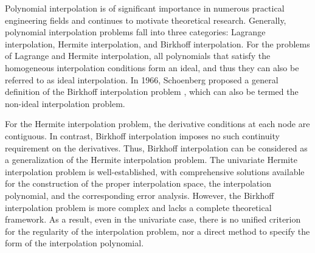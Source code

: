 \documentclass[preprint,12pt]{elsarticle}
\begin{document}



Polynomial interpolation is of significant importance in numerous practical engineering fields and continues to motivate theoretical research. Generally, polynomial interpolation problems fall into three categories: Lagrange interpolation, Hermite interpolation, and Birkhoff interpolation. For the problems of Lagrange and Hermite interpolation, all polynomials that satisfy the homogeneous interpolation conditions form an ideal, and thus they can also be referred to as ideal interpolation. In 1966, Schoenberg proposed a general definition of the Birkhoff interpolation problem \cite{wen1}, which can also be termed the non-ideal interpolation problem.

For the Hermite interpolation problem, the derivative conditions at each node are contiguous. In contrast, Birkhoff interpolation imposes no such continuity requirement on the derivatives. Thus, Birkhoff interpolation can be considered as a generalization of the Hermite interpolation problem. The univariate Hermite interpolation problem is well-established, with comprehensive solutions available for the construction of the proper interpolation space, the interpolation polynomial, and the corresponding error analysis. However, the Birkhoff interpolation problem is more complex and lacks a complete theoretical framework. As a result, even in the univariate case, there is no unified criterion for the regularity of the interpolation problem, nor a direct method to specify the form of the interpolation polynomial.
\end{document}
